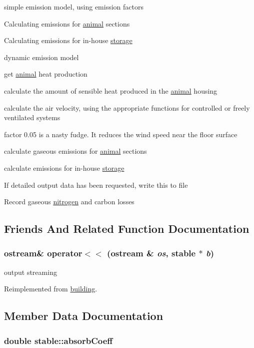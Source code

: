 simple emission model, using emission factors

Calculating emissions for \hyperlink{classanimal}{animal} sections

Calculating emissions for in-\/house \hyperlink{classstorage}{storage}

dynamic emission model

get \hyperlink{classanimal}{animal} heat production

calculate the amount of sensible heat produced in the \hyperlink{classanimal}{animal} housing

calculate the air velocity, using the appropriate functions for controlled or freely ventilated systems

factor 0.05 is a nasty fudge. It reduces the wind speed near the floor surface

calculate gaseous emissions for \hyperlink{classanimal}{animal} sections

calculate emissions for in-\/house \hyperlink{classstorage}{storage}

If detailed output data has been requested, write this to file

Record gaseous \hyperlink{classnitrogen}{nitrogen} and carbon losses 

\subsection{Friends And Related Function Documentation}
\hypertarget{classstable_a3372b8131ba5e161ddda6baf3b22d81d}{
\subsubsection[{operator$<$$<$}]{\setlength{\rightskip}{0pt plus 5cm}ostream\& operator$<$$<$ (ostream \& {\em os}, \/  {\bf stable} $\ast$ {\em b})}}
\label{classstable_a3372b8131ba5e161ddda6baf3b22d81d}


output streaming 

Reimplemented from \hyperlink{classbuilding_a47f4f2ec998d1300d4ccd788b0a668ca}{building}.

\subsection{Member Data Documentation}
\hypertarget{classstable_a3a3775492c3cb96d3e401e257102f77d}{
\subsubsection[{absorbCoeff}]{\setlength{\rightskip}{0pt plus 5cm}double {\bf stable::absorbCoeff}}}
\label{classstable_a3a3775492c3cb96d3e401e257102f77d}


